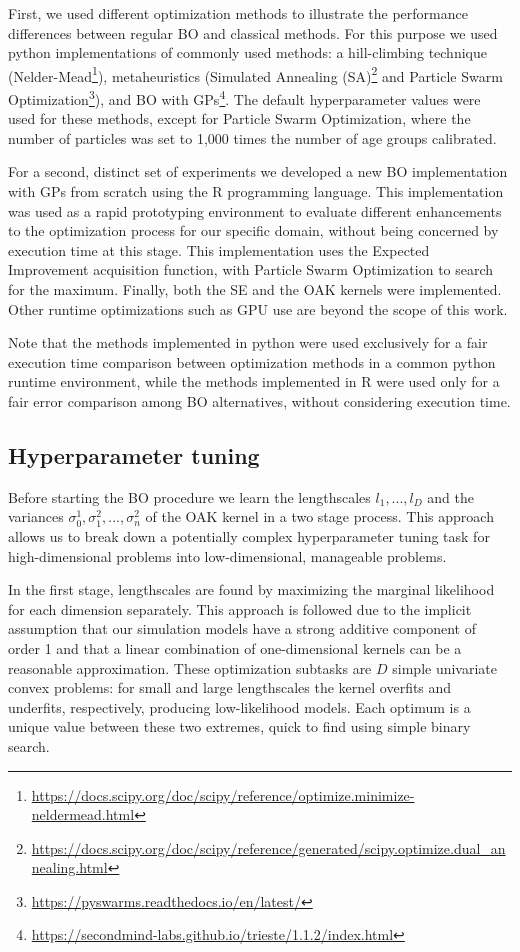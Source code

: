 \documentclass{IOS-Book-Article}
\begin{document}
	First, we used different optimization methods to illustrate the performance differences between regular BO and classical methods. For this purpose we used python implementations of commonly used methods: a hill-climbing technique (Nelder-Mead\footnote{\url{https://docs.scipy.org/doc/scipy/reference/optimize.minimize-neldermead.html}}\cite{nelder-mead}), metaheuristics (Simulated Annealing (SA)\footnote{\url{https://docs.scipy.org/doc/scipy/reference/generated/scipy.optimize.dual_annealing.html}}\cite{simulated-annealing} and Particle Swarm Optimization\footnote{\url{https://pyswarms.readthedocs.io/en/latest/}}\cite{pso}), and BO with GPs\footnote{\url{https://secondmind-labs.github.io/trieste/1.1.2/index.html}}. The default hyperparameter values were used for these methods, except for Particle Swarm Optimization, where the number of particles was set to 1,000 times the number of age groups calibrated.
	
	For a second, distinct set of experiments we developed a new BO implementation with GPs from scratch using the R programming language. This implementation was used as a rapid prototyping environment to evaluate different enhancements to the optimization process for our specific domain, without being concerned by execution time at this stage. This implementation uses the Expected Improvement acquisition function, with Particle Swarm Optimization to search for the maximum. Finally, both the SE and the OAK kernels were implemented. Other runtime optimizations such as GPU use are beyond the scope of this work.
		
	Note that the methods implemented in python were used exclusively for a fair execution time comparison between optimization methods in a common python runtime environment, while the methods implemented in R were used only for a fair error comparison among BO alternatives, without considering execution time.
	
	\subsection{Hyperparameter tuning}

	Before starting the BO procedure we learn the lengthscales $l_1, ..., l_D$ and the variances $\sigma_0^1, \sigma_1^2, ..., \sigma_n^2$ of the OAK kernel in a two stage process. This approach allows us to break down a potentially complex hyperparameter tuning task for high-dimensional problems into low-dimensional, manageable problems.
	
	In the first stage, lengthscales are found by maximizing the marginal likelihood for each dimension separately. This approach is followed due to the implicit assumption that our simulation models have a strong additive component of order 1 and that a linear combination of one-dimensional kernels can be a reasonable approximation. These optimization subtasks are $D$ simple univariate convex problems: for small and large lengthscales the kernel overfits and underfits, respectively, producing low-likelihood models. Each optimum is a unique value between these two extremes, quick to find using simple binary search.
	
\end{document}
